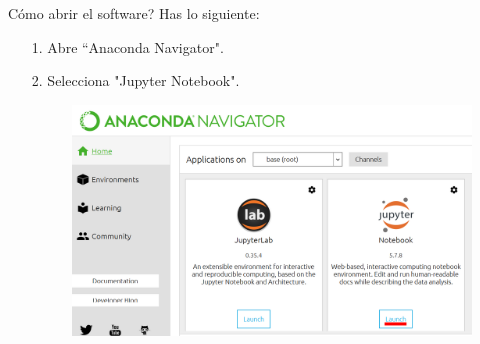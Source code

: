 \begin{frame}[t]{C\'omo abrir el software?}\vspace{-2pt}
Has lo siguiente:

\begin{enumerate}
	\item[1.] Abre ``Anaconda Navigator".
	\item[2.] Selecciona "Jupyter Notebook".
	\begin{figure}
		\includegraphics[scale=0.4]{Images/Anaconda-Jupyter.png}
	\end{figure}
\end{enumerate}


\end{frame}